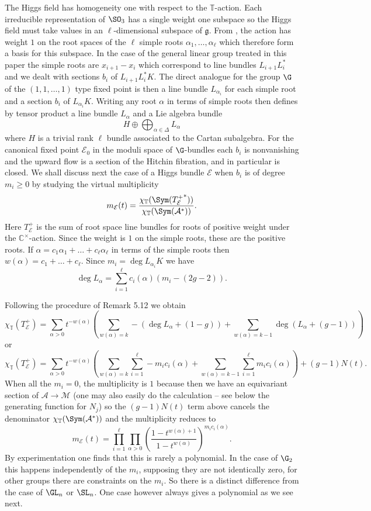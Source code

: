 \documentclass[12pt]{article}
\numberwithin{equation}{section}
\theoremstyle{remark}
\theoremstyle{definition}
\numberwithin{theorem}{section}
\newcommand{\lie}[1]{\mathfrak{#1}}
\def\calE{{\mathcal E}}
\def\C{\mathbb{C}}
\newcommand{\T}{{\mathbb{T}}}
\renewcommand{\1}{\mathbbm{1}}
\begin{document}
The  Higgs field  has homogeneity one with respect to the $\T$-action. Each  irreducible representation of $\SO_3$  has a single weight one subspace so the Higgs field must take values  in an $\ell$-dimensional subspace of $\lie{g}$. From \cite[Lemma 5.2]{Kos}, the action has  weight $1$ on the root spaces of the $\ell$ simple roots $\alpha_1,\dots, \alpha_{\ell}$ which therefore form a basis for this subspace.  In the case of the general linear group  treated in this paper   the simple roots are $x_{i+1}-x_i$ which correspond to line bundles  $L_{i+1}L_i^*$ and we dealt with  sections $b_i$ of $L_{i+1}L_i^*K$. The direct analogue for the group $\G$  of the $(1,1,\dots,1)$ type  fixed point is then a line bundle $L_{\alpha_i}$ for each simple root and a section $b_i$ of $L_{\alpha_i}K$. Writing any root $\alpha$ in terms of simple roots then defines by tensor product a line bundle $L_{\alpha}$ and a Lie algebra bundle 
$$H\oplus \bigoplus_{\alpha\in \Delta}L_{\alpha}$$
where $H$ is a trivial rank $\ell$ bundle associated to the Cartan subalgebra. For the canonical fixed point $\calE_0$  in the moduli space of $\G$-bundles each $b_i$ is nonvanishing and the upward flow is a section of the Hitchin fibration, and in particular is closed. We shall discuss next the case of a Higgs bundle $\calE$ when $b_i$ is of degree $m_i\ge 0$ by studying the virtual multiplicity $$m_\calE(t)=\frac{\chi_{\T}(\Sym ({T_\calE^+}^*))}{\chi_{\T}(\Sym ({\mathcal A}^*))}.$$ 
Here $T_\calE^+$ is the sum of root space line bundles for roots of positive weight under the $\C^{\times}$-action. Since the weight is $1$ on the simple roots, these are the positive roots. If  $\alpha=c_1\alpha_1+\dots+c_{\ell}\alpha_{\ell}$ in terms of the simple roots then $w(\alpha)=c_1+\dots+c_{\ell}$.   Since $m_i=\deg L_{\alpha_i}K$ we have 
$$\deg L_{\alpha}=\sum_{i=1}^{\ell} c_i(\alpha) (m_i-(2g-2)). $$


Following the procedure of  Remark 5.12 we obtain 
$$\chi_\T(T_\calE^+)=\sum_{\alpha>0} t^{-w(\alpha)}\left(\sum_{w(\alpha)=k}-(\deg L_{\alpha}+(1-g))+\sum_{w(\alpha)=k-1}\deg(L_{\alpha}+(g-1))\right)$$
or
$$\chi_\T(T_\calE^+)=\sum_{\alpha>0} t^{-w(\alpha)}\left(\sum_{w(\alpha)=k}\sum_{i=1}^{\ell} -m_ic_i(\alpha) +\sum_{w(\alpha)=k-1}\sum_{i=1}^{\ell} m_ic_i(\alpha) \right)+(g-1)N(t).$$ 
When all the $m_i=0$, the multiplicity is $1$ because then we have an equivariant section of ${\mathcal A}\rightarrow {\mathcal M}$ (one may also easily do the calculation -- see below the generating function for $N_j$) so the $(g-1)N(t)$ term above cancels the denominator ${\chi_{\T}(\Sym ({\mathcal A}^*))}$ and the multiplicity reduces to 
\begin{equation}
m_\calE(t)=\prod_{i=1}^{\ell}\prod_{\alpha>0}\left(\frac{1-t^{w(\alpha)+1}}{1-t^{w(\alpha)}}\right)^{m_ic_i(\alpha)}. 
\label{multG}
\end{equation} 
By experimentation one finds that this is rarely a polynomial. In the case of ${\G}_2$ this happens independently of the $m_i$, supposing they are not identically zero, for other groups there are constraints on the $m_i$. So there is a distinct difference from the case of $\GL_n$ or $\SL_n$. One case however always gives a polynomial as we see next. 
\end{document}
